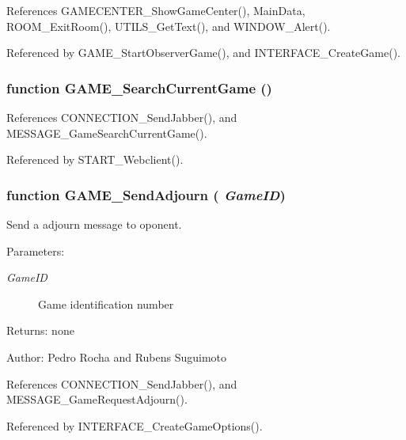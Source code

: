 References GAMECENTER\_\-ShowGameCenter(), MainData, ROOM\_\-ExitRoom(), UTILS\_\-GetText(), and WINDOW\_\-Alert().

Referenced by GAME\_\-StartObserverGame(), and INTERFACE\_\-CreateGame().
\subsubsection[GAME\_\-SearchCurrentGame]{\setlength{\rightskip}{0pt plus 5cm}function GAME\_\-SearchCurrentGame ()}\label{game_2game_8js_15cc2491c569a502201f0586d857fe03}




References CONNECTION\_\-SendJabber(), and MESSAGE\_\-GameSearchCurrentGame().

Referenced by START\_\-Webclient().
\subsubsection[GAME\_\-SendAdjourn]{\setlength{\rightskip}{0pt plus 5cm}function GAME\_\-SendAdjourn ( {\em GameID})}\label{game_2game_8js_c716297838a73de6d2b9e05276c5ebcf}


Send a adjourn message to oponent. 

\begin{Desc}
\item[Parameters:]
\begin{description}
\item[{\em GameID}]Game identification number \end{description}
\end{Desc}
\begin{Desc}
\item[Returns:]none \end{Desc}
\begin{Desc}
\item[Author:]Pedro Rocha and Rubens Suguimoto \end{Desc}


References CONNECTION\_\-SendJabber(), and MESSAGE\_\-GameRequestAdjourn().

Referenced by INTERFACE\_\-CreateGameOptions().
